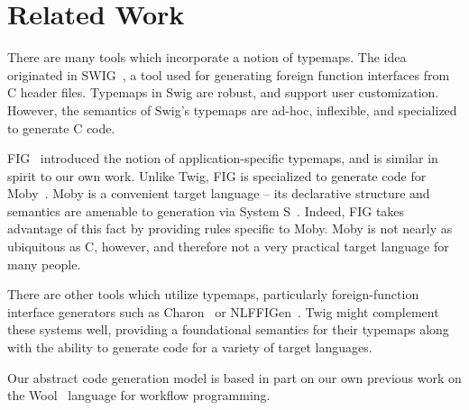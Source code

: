 
\section{Related Work}

There are many tools which incorporate a notion of typemaps. The
idea originated in SWIG~\cite{swig}, a tool used for generating
foreign function interfaces from C header files. Typemaps in Swig
are robust, and support user customization. However, the semantics
of Swig's typemaps are ad-hoc, inflexible, and specialized to
generate C code.

FIG~\cite{fig} introduced the notion of application-specific
typemaps, and is similar in spirit to our own work. Unlike Twig,
FIG is specialized to generate code for Moby~\cite{moby-classes}.
Moby is a convenient target language -- its declarative structure
and semantics are amenable to generation via System
S~\cite{fisher00interop}. Indeed, FIG takes advantage of this fact
by providing rules specific to Moby. Moby is not nearly as
ubiquitous as C, however, and therefore not a very practical
target language for many people.

There are other tools which utilize typemaps, particularly
foreign-function interface generators such as
Charon~\cite{moby-interop-framework} or NLFFIGen~\cite{blume01}.
Twig might complement these systems well, providing a foundational
semantics for their typemaps along with the ability
to generate code for a variety of target languages.

Our abstract code generation model is based in part on our own
previous work on the Wool~\cite{wool} language for workflow
programming.
